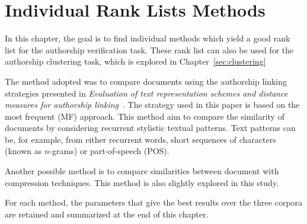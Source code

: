 \chapter{Individual Rank Lists Methods \label{sec:individual_methods}}

In this chapter, the goal is to find individual methods which yield a good rank list for the authorship verification task.
These rank list can also be used for the authorship clustering task, which is explored in Chapter~\ref{sec:clustering}

The method adopted was to compare documents using the authorship linking strategies presented in \textit{Evaluation of text representation schemes and distance measures for authorship linking}~\cite{kocher_verification}.
The strategy used in this paper is based on the most frequent (MF) approach.
This method aim to compare the similarity of documents by considering recurrent stylistic textual patterns.
Text patterns can be, for example, from either recurrent words, short sequences of characters (known as $n$-grams) or part-of-speech (POS).

Another possible method is to compare similarities between document with compression techniques.
This method is also slightly explored in this study.

For each method, the parameters that give the best results over the three corpora are retained and summarized at the end of this chapter.








